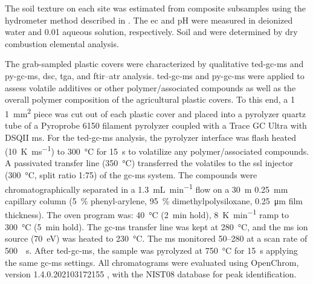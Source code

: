 The soil texture on each site was estimated from composite subsamples using the hydrometer method described in \citet{ASTMD422-63Standard2007}. The \ac{ec} and pH were measured in deionized water and \SI{0.01}{\Molar}  aqueous solution, respectively. Soil  and  were determined by dry combustion elemental analysis.

The grab-sampled plastic covers were characterized by qualitative \ac{ted-gc-ms} and \ac{py-gc-ms}, \ac{dsc}, \ac{tga}, and \ac{ftir}--\ac{atr} analysis.
\ac{ted-gc-ms} and \ac{py-gc-ms} were applied to assess volatile additives or other polymer\-/associated compounds as well as the overall polymer composition of the agricultural plastic covers. To this end, a \num{1}\,\texttimes\,\SI{1}{\square\milli\meter} piece was cut out of each plastic cover and placed into a pyrolyzer quartz tube of a Pyroprobe 6150 filament pyrolyzer coupled with a Trace GC Ultra with DSQII \ac{ms}.
For the \ac{ted-gc-ms} analysis, the pyrolyzer interface was flash heated (\SI{10}{\kelvin\per\milli\second}) to \SI{300}{\degreeCelsius} for \SI{15}{\second} to volatilize any polymer\-/associated compounds. A passivated transfer line (\SI{350}{\degreeCelsius}) transferred the volatiles to the \ac{ssl} injector (\SI{300}{\degreeCelsius}, split ratio 1:75) of the \ac{gc-ms} system.
The compounds were chromatographically separated in a \SI{1.3}{\milli\liter\per\minute}  flow on a \SI{30}{\meter}\,\texttimes\,\SI{0.25}{\milli\meter} capillary column (\SI{5}{\percent} phenyl-arylene, \SI{95}{\percent} dimethylpolysiloxane, \SI{0.25}{\micro\meter} film thickness). The oven program was: \SI{40}{\degreeCelsius} (\SI{2}{\minute} hold), \SI{8}{\kelvin\per\minute} ramp to \SI{300}{\degreeCelsius} (\SI{5}{\minute} hold). The \ac{gc-ms} transfer line was kept at \SI{280}{\degreeCelsius}, and the \ac{ms} ion source (\SI{70}{\electronvolt}) was heated to \SI{230}{\degreeCelsius}. The \ac{ms} monitored \SIrange{50}{280}{\mz} at a scan rate of \SI{500}{\per\second}.
After \ac{ted-gc-ms}, the sample was pyrolyzed at \SI{750}{\degreeCelsius} for \SI{15}{\second} applying the same \ac{gc-ms} settings. All chromatograms were evaluated using OpenChrom, version 1.4.0.202103172155 \citep{WenigOpenChrom2010}, with the NIST08 database for peak identification.

